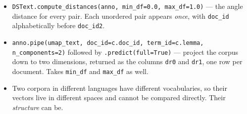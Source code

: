 \documentclass[11pt, a4paper]{article}
\newcommand{\code}[1]{\texttt{#1}}
\begin{document}
\begin{itemize}
  \item \code{DSText.compute\_distances(anno, min\_df=0.0, max\_df=1.0)} --- the angle distance
        for every pair. Each unordered pair appears \textit{once}, with \code{doc\_id}
        alphabetically before \code{doc\_id2}.
  \item \code{anno.pipe(umap\_text, doc\_id=c.doc\_id, term\_id=c.lemma, n\_components=2)}
        followed by \code{.predict(full=True)} --- project the corpus down to two dimensions,
        returned as the columns \code{dr0} and \code{dr1}, one row per document. Takes
        \code{min\_df} and \code{max\_df} as well.
  \item Two corpora in different languages have different vocabularies, so their vectors live
        in different spaces and cannot be compared directly. Their \textit{structure} can be.
\end{itemize}
\end{document}
